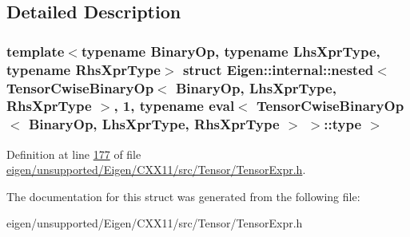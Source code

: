 \subsection{Detailed Description}
\subsubsection*{template$<$typename Binary\+Op, typename Lhs\+Xpr\+Type, typename Rhs\+Xpr\+Type$>$\newline
struct Eigen\+::internal\+::nested$<$ Tensor\+Cwise\+Binary\+Op$<$ Binary\+Op, Lhs\+Xpr\+Type, Rhs\+Xpr\+Type $>$, 1, typename eval$<$ Tensor\+Cwise\+Binary\+Op$<$ Binary\+Op, Lhs\+Xpr\+Type, Rhs\+Xpr\+Type $>$ $>$\+::type $>$}



Definition at line \hyperlink{eigen_2unsupported_2_eigen_2_c_x_x11_2src_2_tensor_2_tensor_expr_8h_source_l00177}{177} of file \hyperlink{eigen_2unsupported_2_eigen_2_c_x_x11_2src_2_tensor_2_tensor_expr_8h_source}{eigen/unsupported/\+Eigen/\+C\+X\+X11/src/\+Tensor/\+Tensor\+Expr.\+h}.



The documentation for this struct was generated from the following file\+:\begin{DoxyCompactItemize}
\item 
eigen/unsupported/\+Eigen/\+C\+X\+X11/src/\+Tensor/\+Tensor\+Expr.\+h\end{DoxyCompactItemize}

